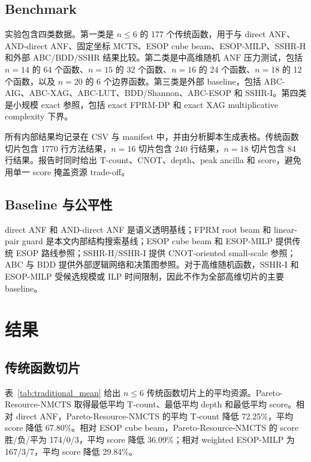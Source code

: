 \documentclass[UTF8,fontset=macnew,11pt]{ctexart}
\newcommand{\pareto}{Pareto-Resource-NMCTS}
\newcommand{\anf}{\ensuremath{\mathrm{ANF}}}
\begin{document}
\subsection{Benchmark}

实验包含四类数据。第一类是 $n\leq6$ 的 177 个传统函数，用于与 direct ANF、AND-direct ANF、固定坐标 MCTS、ESOP cube beam、ESOP-MILP、SSHR-H 和外部 ABC/BDD/SSHR 结果比较。第二类是中高维随机 \anf{} 压力测试，包括 $n=14$ 的 64 个函数、$n=15$ 的 32 个函数、$n=16$ 的 24 个函数、$n=18$ 的 12 个函数，以及 $n=20$ 的 6 个边界函数。第三类是外部 baseline，包括 ABC-AIG、ABC-XAG、ABC-LUT、BDD/Shannon、ABC-ESOP 和 SSHR-I。第四类是小规模 exact 参照，包括 exact FPRM-DP 和 exact XAG multiplicative complexity 下界。

所有内部结果均记录在 CSV 与 manifest 中，并由分析脚本生成表格。传统函数切片包含 1770 行方法结果，$n=16$ 切片包含 240 行结果，$n=18$ 切片包含 84 行结果。报告时同时给出 T-count、CNOT、depth、peak ancilla 和 score，避免用单一 score 掩盖资源 trade-off。

\subsection{Baseline 与公平性}

direct ANF 和 AND-direct ANF 是语义透明基线；FPRM root beam 和 linear-pair guard 是本文内部结构搜索基线；ESOP cube beam 和 ESOP-MILP 提供传统 ESOP 路线参照；SSHR-H/SSHR-I 提供 CNOT-oriented small-scale 参照；ABC 与 BDD 提供外部逻辑网络和决策图参照。对于高维随机函数，SSHR-I 和 ESOP-MILP 受候选规模或 ILP 时间限制，因此不作为全部高维切片的主要 baseline。

\section{结果}

\subsection{传统函数切片}

表~\ref{tab:traditional_mean} 给出 $n\leq6$ 传统函数切片上的平均资源。\pareto{} 取得最低平均 T-count、最低平均 depth 和最低平均 score。相对 direct ANF，\pareto{} 的平均 T-count 降低 72.25\%，平均 score 降低 67.80\%。相对 ESOP cube beam，\pareto{} 的 score 胜/负/平为 174/0/3，平均 score 降低 36.09\%；相对 weighted ESOP-MILP 为 167/3/7，平均 score 降低 29.84\%。
\end{document}
